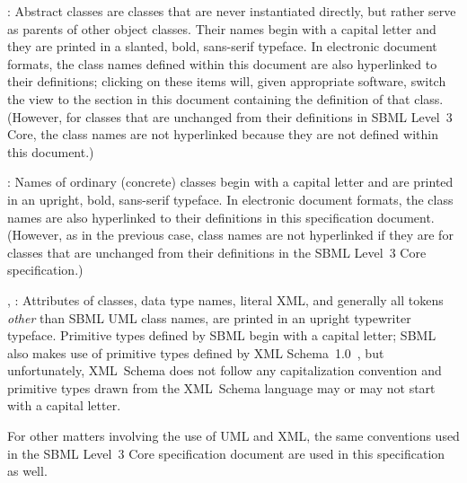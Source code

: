 \begin{description}
  
\item {}: Abstract classes are classes that
  are never instantiated directly, but rather serve as parents of other
  object classes.  Their names begin with a capital letter and they are
  printed in a slanted, bold, sans-serif typeface.  In electronic
  document formats, the class names defined within this document are
  also hyperlinked to their definitions; clicking
  on these items will, given appropriate software, switch the view to
  the section in this document containing the definition of that class.
  (However, for classes that are unchanged from their definitions in
  SBML Level~3 Core, the class names are not hyperlinked because they
  are not defined within this document.)
  
\item {}: Names of ordinary (concrete) classes begin with a
  capital letter and are printed in an upright, bold, sans-serif
  typeface.  In electronic document formats, the class names are also
  hyperlinked to their definitions in this specification document.
  (However, as in the previous case, class names are not hyperlinked if
  they are for classes that are unchanged from their definitions in the
  SBML Level~3 Core specification.)

\item {}, : Attributes of classes, data
  type names, literal XML, and generally all tokens \emph{other} than
  SBML UML class names, are printed in an upright typewriter typeface.
  Primitive types defined by SBML begin with a capital letter; SBML also
  makes use of primitive types defined by XML
  Schema~1.0~\citep{biron:2000,fallside:2000,thompson:2000}, but
  unfortunately, XML~Schema does not follow any capitalization
  convention and primitive types drawn from the XML~Schema language may
  or may not start with a capital letter.

\end{description}

For other matters involving the use of UML and XML, the same conventions used in the SBML Level~3 Core specification document are used in this specification as well.




